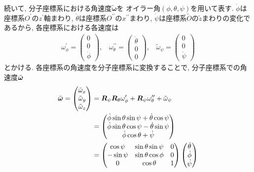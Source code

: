 続いて, 分子座標系における角速度$\tilde{\bm{\omega}}$を
オイラー角$(\phi,\theta,\psi)$を用いて表す. 
$\dot{\phi}$は座標系$O^{\prime}$の$z^{\prime}$軸まわり,
$\dot{\theta}$は座標系$O^{\prime \prime}$の$x^{\prime \prime}$まわり, 
$\dot{\psi}$は座標系$\tilde{O}$の$\tilde{z}$まわりの変化であるから, 各座標系における各速度は
\begin{align}
 \omega_{\phi}^{\prime}
 =
 \begin{pmatrix}
  0 \\ 0 \\ \dot{\phi}
 \end{pmatrix}
 , ~~~~
  \omega_{\theta}^{\prime \prime}
 =
 \begin{pmatrix}
  \dot{\theta} \\ 0 \\ 0
 \end{pmatrix}
 , ~~~~
  \tilde{\omega}_{\psi}
 =
 \begin{pmatrix}
  0 \\ 0 \\ \dot{\psi}
 \end{pmatrix}
 \label{eq:RigidBodyMD5}
\end{align}
とかける. 
各座標系の角速度を分子座標系に変換することで, 分子座標系での角速度$\Tilde{\bm{\omega}}$
\begin{align}
 \tilde{\bm{\omega}}
 =
 \begin{pmatrix}
  \Tilde{\omega}_{x} \\
  \Tilde{\omega}_{y} \\
  \Tilde{\omega}_{z} \\
 \end{pmatrix}
 &=
   \bm{R}_{\psi}\bm{R}_{\theta}\omega_{\phi}^{\prime}
 + \bm{R}_{\psi}\omega_{\theta}^{\prime \prime}
 + \tilde{\omega}_{\psi}
 \notag
 \\
 &=
 \begin{pmatrix}
  \dot{\phi}\sin\theta \sin\psi + \dot{\theta}\cos\psi \\
  \dot{\phi}\sin\theta \cos\psi - \dot{\theta}\sin\psi \\
  \dot{\phi}\cos\theta + \dot{\psi}
 \end{pmatrix}
 \notag \\
 &=
 \begin{pmatrix}
    \cos\psi & \sin\theta \sin\psi & 0 \\
   -\sin\psi & \sin\theta \cos\phi & 0 \\
           0 & \cos\theta          & 1
 \end{pmatrix}
 \begin{pmatrix}
  \dot{\theta} \\ \dot{\phi} \\ \dot{\psi}
 \end{pmatrix} 
 \notag
\end{align}
